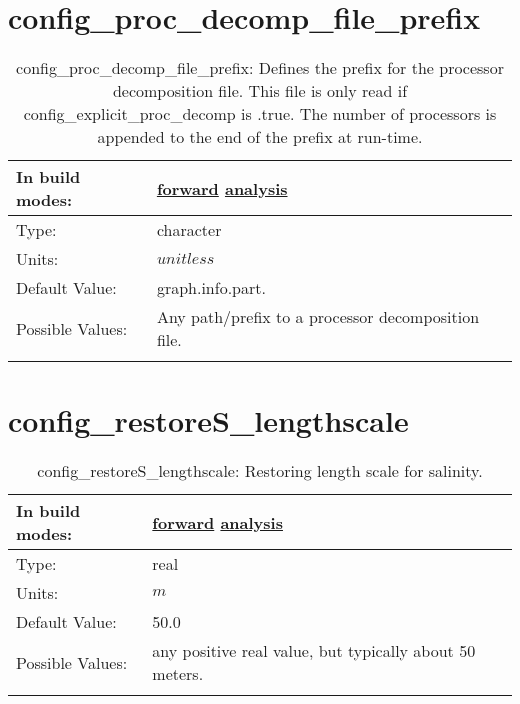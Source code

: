 \section[config\_proc\_decomp\_file\_prefix]{config\_proc\_decomp\_file\_prefix}
\label{sec:nm_sec_config_proc_decomp_file_prefix}
\begin{center}
\begin{longtable}{| p{2.0in} || p{4.0in} |}
    \hline
    In build modes: & \hyperref[subsec:forward_nm_tab_decomposition]{forward} \hyperref[subsec:analysis_nm_tab_decomposition]{analysis} \\
    \hline
    Type: & character \\
    \hline
    Units: & $unitless$ \\
    \hline
    Default Value: & graph.info.part. \\
    \hline
    Possible Values: & Any path/prefix to a processor decomposition file. \\
    \hline
    \caption{config\_proc\_decomp\_file\_prefix: Defines the prefix for the processor decomposition file. This file is only read if config\_explicit\_proc\_decomp is .true. The number of processors is appended to the end of the prefix at run-time.}
\end{longtable}
\end{center}
\section[config\_restoreS\_lengthscale]{config\_restoreS\_lengthscale}
\label{sec:nm_sec_config_restoreS_lengthscale}
\begin{center}
\begin{longtable}{| p{2.0in} || p{4.0in} |}
    \hline
    In build modes: & \hyperref[subsec:forward_nm_tab_forcing]{forward} \hyperref[subsec:analysis_nm_tab_forcing]{analysis} \\
    \hline
    Type: & real \\
    \hline
    Units: & $m$ \\
    \hline
    Default Value: & 50.0 \\
    \hline
    Possible Values: & any positive real value, but typically about 50 meters. \\
    \hline
    \caption{config\_restoreS\_lengthscale: Restoring length scale for salinity.}
\end{longtable}
\end{center}
